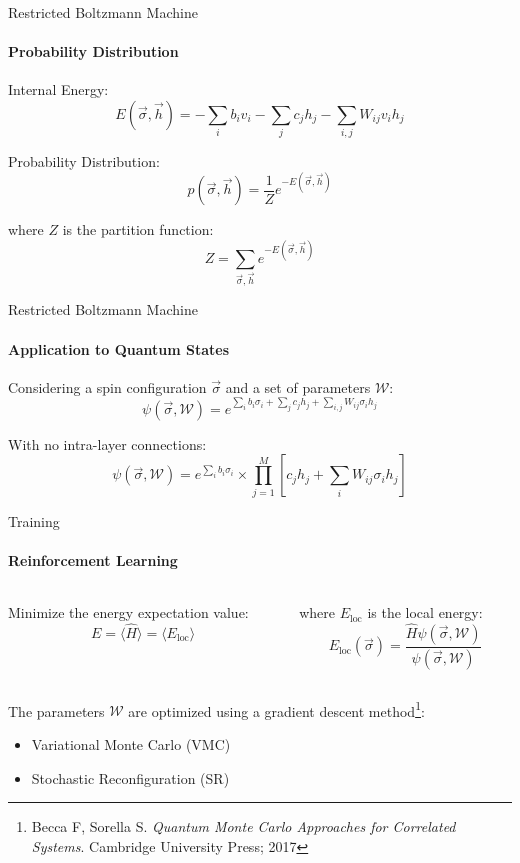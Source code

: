 \documentclass{beamer}
\begin{document}
\begin{frame}{Restricted Boltzmann Machine}
\framesubtitle{Probability Distribution}
Internal Energy:
$$E(\vec{\sigma}, \vec{h}) = -\sum_{i} b_i v_i - \sum_{j} c_j h_j - \sum_{i,j} W_{ij} v_i h_j$$

Probability Distribution:
$$p(\vec{\sigma}, \vec{h}) = \frac{1}{Z} e^{-E(\vec{\sigma}, \vec{h})}$$

where $Z$ is the partition function:
$$Z = \sum_{\vec{\sigma}, \vec{h}} e^{-E(\vec{\sigma}, \vec{h})}$$
\end{frame}

\begin{frame}{Restricted Boltzmann Machine}
\framesubtitle{Application to Quantum States}
Considering a spin configuration $\vec{\sigma}$ and a set of parameters $\mathcal{W}$:
$$\psi\left( \vec{\sigma}, \mathcal{W} \right) = e^{\sum_{i} b_i \sigma_i + \sum_{j} c_j h_j + \sum_{i,j} W_{ij} \sigma_i h_j}$$

With no intra-layer connections:
$$\psi\left( \vec{\sigma}, \mathcal{W} \right) = e^{\sum_{i} b_i \sigma_i} \times \prod_{j=1}^{M} {\left[ c_j h_j + \sum_{i} W_{ij} \sigma_i h_j\right]}$$
\end{frame}

\begin{frame}{Training}
\framesubtitle{Reinforcement Learning}
\begin{columns}
\begin{column}{0.5\textwidth}
Minimize the energy expectation value:
$$E = \langle \hat{H} \rangle = \langle E_{\text{loc}} \rangle $$
\end{column}
\begin{column}{0.5\textwidth}    
where $E_{\text{loc}}$ is the local energy:
$$E_{\text{loc}}(\vec{\sigma}) = \frac{\hat{H} \psi\left( \vec{\sigma}, \mathcal{W} \right)}{\psi\left( \vec{\sigma}, \mathcal{W} \right)}$$
\end{column}
\end{columns}
\baselineskip

The parameters $\mathcal{W}$ are optimized using a gradient descent method\footnote{Becca F, Sorella S. \textit{Quantum Monte Carlo Approaches for Correlated Systems}. Cambridge University Press; 2017}:
\begin{itemize}
	\item Variational Monte Carlo (VMC)
	\item Stochastic Reconfiguration (SR)
\end{itemize}

\end{frame}
\end{document}
